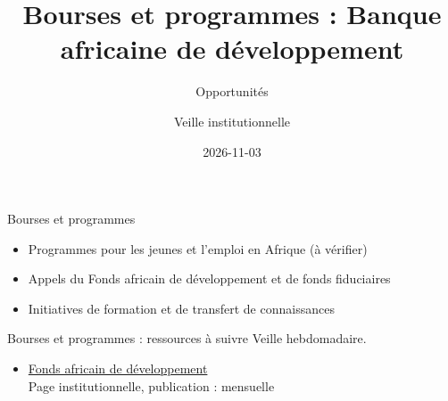 \documentclass[aspectratio=169,11pt]{beamer}
\title{Bourses et programmes : Banque africaine de développement}
\subtitle{Opportunités}
\author{Veille institutionnelle}
\date{2026-11-03}
\begin{document}
\begin{frame}\titlepage\end{frame}

\begin{frame}{Bourses et programmes}
\begin{itemize}
\item Programmes pour les jeunes et l'emploi en Afrique (à vérifier)
\item Appels du Fonds africain de développement et de fonds fiduciaires
\item Initiatives de formation et de transfert de connaissances
\end{itemize}
\end{frame}

\begin{frame}{Bourses et programmes : ressources à suivre}
\small
Veille hebdomadaire.
\begin{itemize}
\item \href{https://www.afdb.org/en/about-us/african-development-fund}{Fonds africain de développement}\\{\footnotesize Page institutionnelle, publication : mensuelle}
\end{itemize}
\end{frame}
\end{document}

